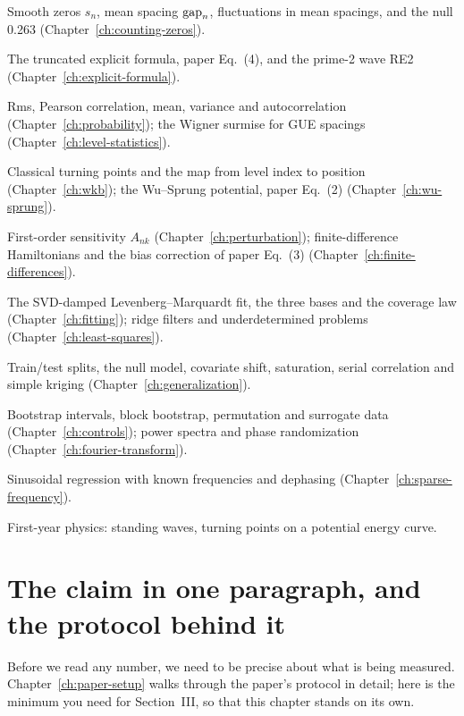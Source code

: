 \begin{prerequisites}
\item Smooth zeros $s_n$, mean spacing $\mathrm{gap}_n$, fluctuations in mean spacings, and the null 0.263 (Chapter~\ref{ch:counting-zeros}).
\item The truncated explicit formula, paper Eq.~(4), and the prime-2 wave RE2 (Chapter~\ref{ch:explicit-formula}).
\item Rms, Pearson correlation, mean, variance and autocorrelation (Chapter~\ref{ch:probability}); the Wigner surmise for GUE spacings (Chapter~\ref{ch:level-statistics}).
\item Classical turning points and the map from level index to position (Chapter~\ref{ch:wkb}); the Wu--Sprung potential, paper Eq.~(2) (Chapter~\ref{ch:wu-sprung}).
\item First-order sensitivity $A_{nk}$ (Chapter~\ref{ch:perturbation}); finite-difference Hamiltonians and the bias correction of paper Eq.~(3) (Chapter~\ref{ch:finite-differences}).
\item The SVD-damped Levenberg--Marquardt fit, the three bases and the coverage law (Chapter~\ref{ch:fitting}); ridge filters and underdetermined problems (Chapter~\ref{ch:least-squares}).
\item Train/test splits, the null model, covariate shift, saturation, serial correlation and simple kriging (Chapter~\ref{ch:generalization}).
\item Bootstrap intervals, block bootstrap, permutation and surrogate data (Chapter~\ref{ch:controls}); power spectra and phase randomization (Chapter~\ref{ch:fourier-transform}).
\item Sinusoidal regression with known frequencies and dephasing (Chapter~\ref{ch:sparse-frequency}).
\item First-year physics: standing waves, turning points on a potential energy curve.
\end{prerequisites}

\section{The claim in one paragraph, and the protocol behind it}\label{sec:paper-memorization-claim}

Before we read any number, we need to be precise about what is being measured. Chapter~\ref{ch:paper-setup} walks through the paper's protocol in detail; here is the minimum you need for Section~III, so that this chapter stands on its own.

